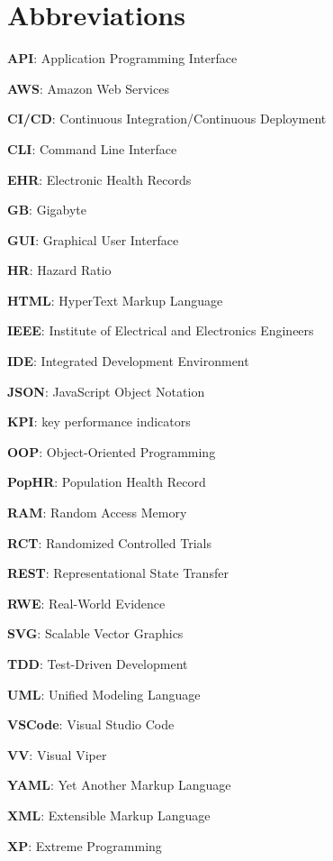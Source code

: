 \chapter*{Abbreviations}\label{abbreviations}
\thispagestyle{plain}

\textbf{API}: Application Programming Interface

\textbf{AWS}: Amazon Web Services

\textbf{CI/CD}: Continuous Integration/Continuous Deployment

\textbf{CLI}: Command Line Interface

\textbf{EHR}: Electronic Health Records

\textbf{GB}: Gigabyte

\textbf{GUI}: Graphical User Interface

\textbf{HR}: Hazard Ratio

\textbf{HTML}: HyperText Markup Language

\textbf{IEEE}: Institute of Electrical and Electronics Engineers

\textbf{IDE}: Integrated Development Environment

\textbf{JSON}: JavaScript Object Notation

\textbf{KPI}: key performance indicators

\textbf{OOP}: Object-Oriented Programming

\textbf{PopHR}: Population Health Record

\textbf{RAM}: Random Access Memory

\textbf{RCT}: Randomized Controlled Trials

\textbf{REST}: Representational State Transfer

\textbf{RWE}: Real-World Evidence

\textbf{SVG}: Scalable Vector Graphics

\textbf{TDD}: Test-Driven Development

\textbf{UML}: Unified Modeling Language

\textbf{VSCode}: Visual Studio Code

\textbf{VV}: Visual Viper

\textbf{YAML}: Yet Another Markup Language

\textbf{XML}: Extensible Markup Language

\textbf{XP}: Extreme Programming
